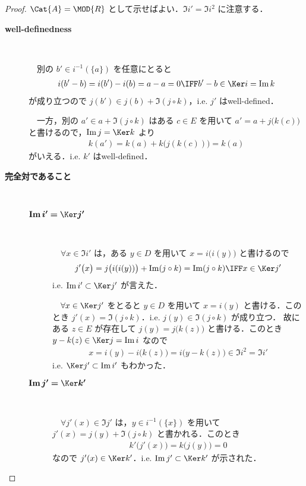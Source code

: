 \documentclass[algtopo_main]{subfiles}
\begin{document}
\begin{proof}
    $\Cat{A} = \MOD{R}$ として示せばよい．$\Im i' = \Im i^2$ に注意する．
    \begin{description}
        \item[\textbf{well-definedness}] 　
        
        　別の $b' \in i^{-1}(\{a\})$ を任意にとると
        \begin{align}
            i(b' - b) = i(b') - i(b) = a - a = 0 \IFF b' - b \in \Ker i = \Im k
        \end{align}
        が成り立つので $j(b') \in j(b) + \Im (j\circ k)$，i.e. $j'$ はwell-defined．

        　一方，別の $a' \in a + \Im (j \circ k)$ はある $c \in E$ を用いて $a' = a + j \bigl( k(c) \bigr) $ と書けるので，$\Im j = \Ker k$ より
        \begin{align}
            k(a') = k(a) + k \bigl( j (k(c)) \bigr) = k(a)
        \end{align}
        がいえる．i.e. $k'$ はwell-defined．
        \item[\textbf{完全対であること}]　
        \begin{description}
            \item[$\bm{\mathrm{Im}\, i' = \Ker j'}$]　
            
            　$\forall x \in \Im i'$ は，ある $y \in D$ を用いて $x = i\bigl( i(y) \bigr)$ と書けるので
            \begin{align}
                j' \bigl( x \bigr) = j \bigl( i (i(y)) \bigr)  + \Im (j \circ k) = \Im (j \circ k) \IFF x \in \Ker j'
            \end{align}
            i.e. $\Im i' \subset \Ker j'$ が言えた．

            　$\forall x \in \Ker j'$ をとると $y \in D$ を用いて $x = i(y)$ と書ける．このとき $j'(x) = \Im (j \circ k)$．i.e. $j(y) \in \Im (j\circ k)$ が成り立つ．
            故にある $z \in E$ が存在して $j(y) = j \bigl( k(z) \bigr)$ と書ける．このとき
            $y - k(z) \in \Ker j = \Im i$ なので 
            \begin{align}
                x = i(y) - i \bigl( k(z) \bigr) = i\bigl(y - k(z)\bigr) \in \Im i^2 = \Im i'
            \end{align}
            i.e. $\Ker j' \subset \Im i'$ もわかった．
            \item[$\bm{\mathrm{Im}\, j' = \Ker k'}$]　
            
            　$\forall j'(x) \in \Im j'$ は，$y \in i^{-1}(\{x\})$ を用いて $j'(x) = j(y) + \Im (j \circ k)$ と書かれる．このとき
            \begin{align}
                k' \bigl( j'(x) \bigr) = k \bigl( j(y) \bigr) = 0
            \end{align}
            なので $j'(x) \in \Ker k'$．i.e. $\Im j' \subset \Ker k'$ が示された．


\end{description}
\end{description}
\end{proof}
\end{document}
